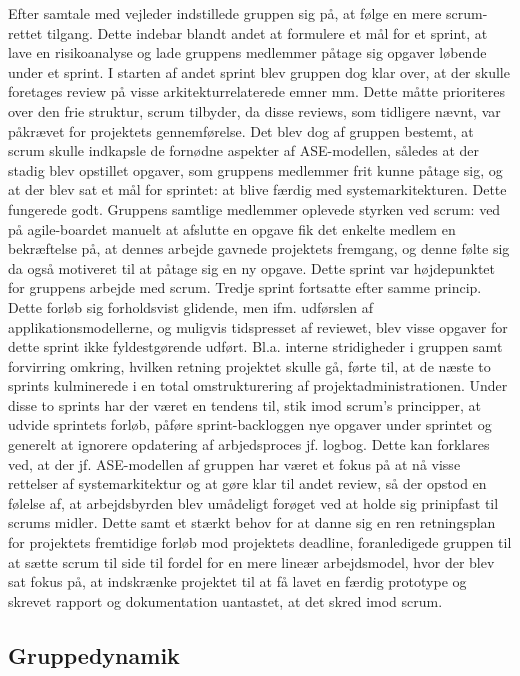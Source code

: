 Efter samtale med vejleder indstillede gruppen sig på, at følge en mere scrum-rettet tilgang. Dette indebar blandt andet at formulere et mål for et sprint, at lave en risikoanalyse og lade gruppens medlemmer påtage sig opgaver løbende under et sprint. I starten af andet sprint blev gruppen dog klar over, at der skulle foretages review på visse arkitekturrelaterede emner mm. Dette måtte prioriteres over den frie struktur, scrum tilbyder, da disse reviews, som tidligere nævnt, var påkrævet for projektets gennemførelse. Det blev dog af gruppen bestemt, at scrum skulle indkapsle de fornødne aspekter af ASE-modellen, således at der stadig blev opstillet opgaver, som gruppens medlemmer frit kunne påtage sig, og at der blev sat et mål for sprintet: at blive færdig med systemarkitekturen. Dette fungerede godt. Gruppens samtlige medlemmer oplevede styrken ved scrum: ved på agile-boardet manuelt at afslutte en opgave fik det enkelte medlem en bekræftelse på, at dennes arbejde gavnede projektets fremgang, og denne følte sig da også motiveret til at påtage sig en ny opgave. Dette sprint var højdepunktet for gruppens arbejde med scrum. Tredje sprint fortsatte efter samme princip. Dette forløb sig forholdsvist glidende, men ifm. udførslen af applikationsmodellerne, og muligvis tidspresset af reviewet, blev visse opgaver for dette sprint ikke fyldestgørende udført. Bl.a. interne stridigheder i gruppen samt forvirring omkring, hvilken retning projektet skulle gå, førte til, at de næste to sprints kulminerede i en total omstrukturering af projektadministrationen. Under disse to sprints
har der været en tendens til, stik imod scrum's principper, at udvide sprintets forløb, påføre sprint-backloggen nye opgaver under sprintet og generelt at ignorere opdatering af arbjedsproces jf. logbog. Dette kan forklares ved, at der jf. ASE-modellen af gruppen har været et fokus på at nå visse rettelser af systemarkitektur og at gøre klar til andet review, så der opstod en følelse af, at arbejdsbyrden blev umådeligt forøget ved at holde sig prinipfast til scrums midler. Dette samt
et stærkt behov for at danne sig en ren retningsplan for projektets fremtidige forløb mod projektets deadline, foranledigede gruppen til at sætte scrum til side til fordel for en mere lineær arbejdsmodel, hvor der blev sat fokus på, at indskrænke projektet til at få lavet en færdig prototype og skrevet rapport og dokumentation uantastet, at det skred imod scrum.


\subsection{Gruppedynamik}

